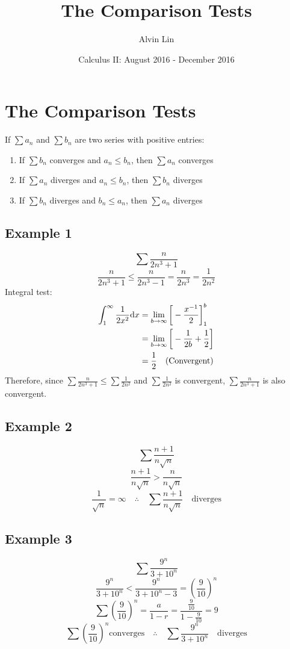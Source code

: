 \documentclass{math}
\title{The Comparison Tests}
\author{Alvin Lin}
\date{Calculus II: August 2016 - December 2016}
\begin{document}
\maketitle

\section*{The Comparison Tests}
If \( \sum{a_{n}} \) and \( \sum{b_{n}} \) are two series with positive entries:
\begin{enumerate}
  \item If \( \sum{b_{n}} \) converges and \( a_{n} \leq b_{n} \), then
    \( \sum{a_{n}} \) converges
  \item If \( \sum{a_{n}} \) diverges and \( a_{n} \leq b_{n} \), then
    \( \sum{b_{n}} \) diverges
  \item If \( \sum{b_{n}} \) diverges and \( b_{n} \leq a_{n} \), then
    \( \sum{a_{n}} \) diverges
\end{enumerate}

\subsection*{Example 1}
\[ \sum\frac{n}{2n^{3}+1} \]
\[ \frac{n}{2n^{3}+1} \leq \frac{n}{2n^{3}-1} = \frac{n}{2n^{3}} =
   \frac{1}{2n^{2}} \]
Integral test:
\begin{align*}
  \int_{1}^{\infty}\frac{1}{2x^{2}}\mathrm{d}{x} &=
    \lim_{b\to\infty}\bigg[-\frac{x^{-1}}{2}\bigg]_{1}^{b} \\
  &= \lim_{b\to\infty}\bigg[-\frac{1}{2b}+\frac{1}{2}\bigg] \\
  &= \frac{1}{2} \quad \mathrm{(Convergent)}
\end{align*}
Therefore, since \( \sum\frac{n}{2n^{3}+1} \leq \sum\frac{1}{2n^{2}} \) and
\( \sum\frac{1}{2n^{2}} \) is convergent, \( \sum\frac{n}{2n^{3}+1} \) is
also convergent.

\subsection*{Example 2}
\[ \sum\frac{n+1}{n\sqrt{n}} \]
\[ \frac{n+1}{n\sqrt{n}} > \frac{n}{n\sqrt{n}} \]
\[ \frac{1}{\sqrt{n}} = \infty \quad \therefore \quad \sum\frac{n+1}{n\sqrt{n}}
   \quad \mathrm{diverges} \]

\subsection*{Example 3}
\[ \sum\frac{9^{n}}{3+10^{n}} \]
\[ \frac{9^{n}}{3+10^{n}} < \frac{9^{n}}{3+10^{n}-3} = (\frac{9}{10})^{n} \]
\[ \sum(\frac{9}{10})^{n} = \frac{a}{1-r} =
   \frac{\frac{9}{10}}{1-\frac{9}{10}} = 9 \]
\[ \sum(\frac{9}{10})^{n} \mathrm{converges} \quad \therefore \quad
   \sum\frac{9^{n}}{3+10^{n}} \quad \mathrm{diverges} \]
\end{document}
